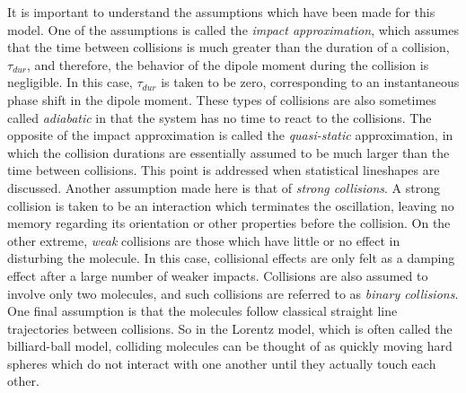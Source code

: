 \documentclass[11pt]{article}
\begin{document}
It is important to understand the assumptions which have been made for this
model.  One of the assumptions is called the {\it impact approximation}, 
which assumes that the time between collisions is much greater than the 
duration of a collision, $\tau_{dur}$, and therefore, the behavior of
the dipole moment during the collision is negligible.  In this case,
$\tau_{dur}$ is taken to be zero, corresponding to an instantaneous 
phase shift in the dipole moment.  These types of collisions are also
sometimes called {\it adiabatic} in that the system has no time to react
to the collisions.  The opposite of the impact approximation is called the
{\it quasi-static} approximation, in which the collision durations are
essentially assumed to be much larger than the time between collisions.
This point is addressed when statistical lineshapes are discussed.
Another assumption made here is that
of {\it strong collisions}.  A strong collision is taken to be an 
interaction which terminates the oscillation, leaving no memory regarding 
its orientation or other properties before the collision.
On the other extreme, {\it weak} collisions are those which have little or
no effect in disturbing the molecule.  In this case, collisional effects 
are only felt as a damping effect after a large number of weaker impacts.
Collisions are also assumed to involve only two molecules, and such 
collisions are referred to as {\it binary collisions}.  One final
assumption is that the molecules follow classical straight line
trajectories between collisions.  So in the Lorentz model, which is often 
called the billiard-ball model, colliding molecules can be thought of as 
quickly moving hard spheres which do not interact with one another 
until they actually touch each other.  
\end{document}
